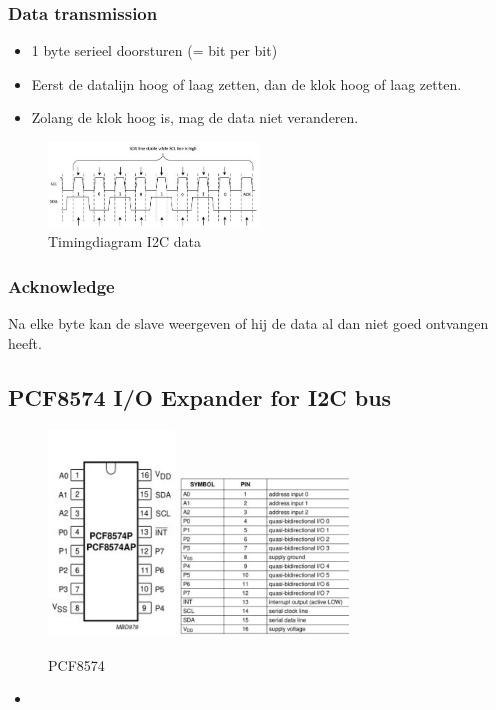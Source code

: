 \documentclass{article}
\begin{document}
\subsubsection{Data transmission}
\begin{itemize}
    \item 1 byte serieel doorsturen (= bit per bit)
    \item Eerst de datalijn hoog of laag zetten, dan de klok hoog of laag zetten. 
    \item Zolang de klok hoog is, mag de data niet veranderen.
\end{itemize}

\begin{figure}[H]
    \centering
    \includegraphics[width=0.5\textwidth]{i2c-timing.png}
    \caption{Timingdiagram I2C data}
\end{figure}

\subsubsection{Acknowledge}
Na elke byte kan de slave weergeven of hij de data al dan niet goed ontvangen heeft.

\subsection{PCF8574 I/O Expander for I2C bus}

\begin{figure}[H]
    \centering
    \includegraphics[width=0.3\textwidth]{pcf.png}
    \includegraphics[width=0.4\textwidth]{pcf-pins.png}
    \caption{PCF8574}
\end{figure}

\begin{itemize}
    \item 
\end{itemize}
\end{document}
